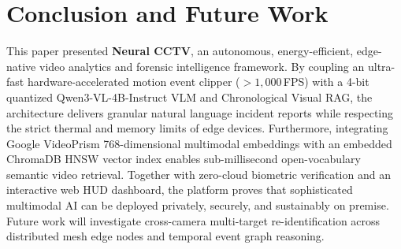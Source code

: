 \documentclass[10pt, conference]{IEEEtran}
\begin{document}
\section{Conclusion and Future Work}
\label{sec:conclusion}

This paper presented \textbf{Neural CCTV}, an autonomous, energy-efficient, edge-native video analytics and forensic intelligence framework. By coupling an ultra-fast hardware-accelerated motion event clipper ($>1,000$\,FPS) with a 4-bit quantized Qwen3-VL-4B-Instruct VLM and Chronological Visual RAG, the architecture delivers granular natural language incident reports while respecting the strict thermal and memory limits of edge devices. Furthermore, integrating Google VideoPrism 768-dimensional multimodal embeddings with an embedded ChromaDB HNSW vector index enables sub-millisecond open-vocabulary semantic video retrieval. Together with zero-cloud biometric verification and an interactive web HUD dashboard, the platform proves that sophisticated multimodal AI can be deployed privately, securely, and sustainably on premise. Future work will investigate cross-camera multi-target re-identification across distributed mesh edge nodes and temporal event graph reasoning.
\end{document}
